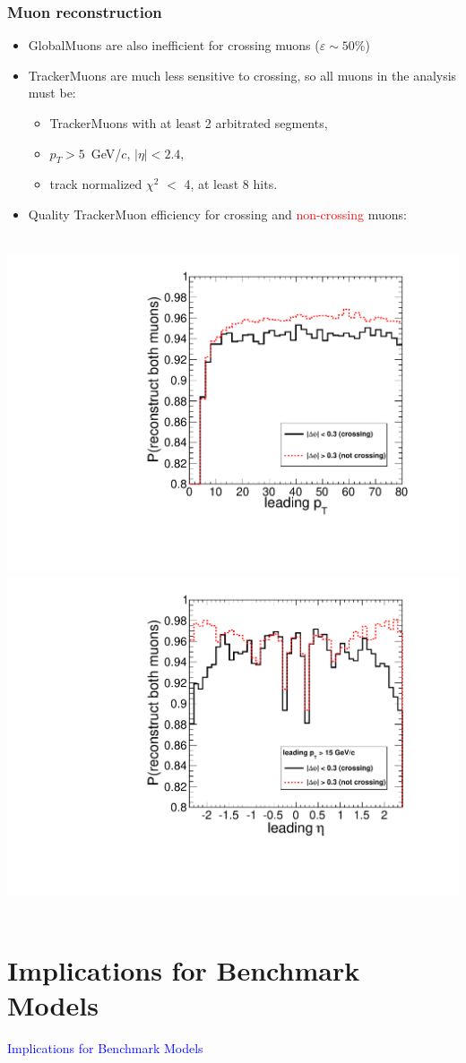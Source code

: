 \documentclass[compress]{beamer}
\begin{document}
\begin{frame}
\frametitle{Muon reconstruction}

\begin{itemize}
\item GlobalMuons are also inefficient for crossing muons ($\varepsilon \sim 50$\%)
\item TrackerMuons are much less sensitive to crossing, so all muons in the analysis must be:
\begin{itemize}
\item TrackerMuons with at least 2 arbitrated segments,
\item $p_T > 5$~GeV/$c$, $|\eta| < 2.4$,
\item track normalized $\chi^2$ $<$ 4, at least 8 hits.
\end{itemize}

\item Quality TrackerMuon efficiency for crossing and \textcolor{red}{non-crossing} muons:
\end{itemize}

\mbox{ } \hfill \includegraphics[width=0.4\linewidth]{pt_mass5cut_twoTrackerMuons.pdf} \hfill
\includegraphics[width=0.4\linewidth]{eta_mass5cut_twoTrackerMuons.pdf} \hfill \mbox{ }
\end{frame}

\section*{Implications for Benchmark Models}
\begin{frame}

\vfill
\begin{center}
\Huge \textcolor{blue}{Implications for Benchmark Models}
\end{center}

\vfill
\end{frame}
\end{document}
